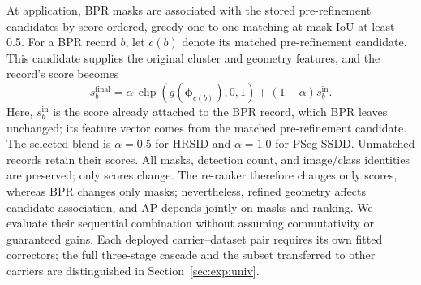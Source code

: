 At application, BPR masks are associated with the stored pre-refinement candidates by score-ordered, greedy one-to-one matching at mask IoU at least 0.5. For a BPR record $b$, let $c(b)$ denote its matched pre-refinement candidate. This candidate supplies the original cluster and geometry features, and the record's score becomes
\begin{equation}\label{eq:rrblend}
s_b^{\mathrm{final}}=\alpha\,\operatorname{clip}(g(\boldsymbol{\phi}_{c(b)}),0,1)
 +(1-\alpha)s_b^{\mathrm{in}}.
\end{equation}
Here, $s_b^{\mathrm{in}}$ is the score already attached to the BPR record, which BPR leaves unchanged; its feature vector comes from the matched pre-refinement candidate. The selected blend is $\alpha=0.5$ for HRSID and $\alpha=1.0$ for PSeg-SSDD. Unmatched records retain their scores. All masks, detection count, and image/class identities are preserved; only scores change. The re-ranker therefore changes only scores, whereas BPR changes only masks; nevertheless, refined geometry affects candidate association, and AP depends jointly on masks and ranking. We evaluate their sequential combination without assuming commutativity or guaranteed gains. Each deployed carrier--dataset pair requires its own fitted correctors; the full three-stage cascade and the subset transferred to other carriers are distinguished in Section~\ref{sec:exp:univ}.
